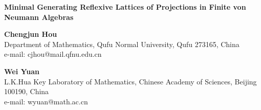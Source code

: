 \documentclass[12pt]{article}
\begin{document}
\begin{center}
{\Large \bf Minimal Generating Reflexive Lattices of Projections in
Finite von Neumann Algebras}
\end{center}

\begin{center}

{\bf Chengjun Hou}\\

Department of Mathematics, Qufu Normal University, Qufu 273165,
China\\
e-mail: cjhou@mail.qfnu.edu.cn\\
\vspace{2mm}

{\bf Wei Yuan}\\
L.K.Hua Key Laboratory of Mathematics, Chinese Academy of Sciences,
Beijing 100190, China\\
e-mail: wyuan@math.ac.cn

\end{center}
\end{document}
